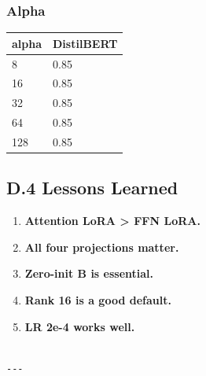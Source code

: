 \subsubsection{Alpha}

\begin{table}[H]
\centering
\small
\begin{tabular}{ll}
\toprule
\textbf{alpha} & \textbf{DistilBERT} \\
\midrule
8 & 0.85 \\
16 & 0.85 \\
32 & 0.85 \\
64 & 0.85 \\
128 & 0.85 \\
\bottomrule
\end{tabular}
\end{table}

\subsection{D.4 Lessons Learned}

\begin{enumerate}
\item \textbf{Attention LoRA \textgreater{} FFN LoRA.}
\item \textbf{All four projections matter.}
\item \textbf{Zero-init B is essential.}
\item \textbf{Rank 16 is a good default.}
\item \textbf{LR 2e-4 works well.}
\end{enumerate}
\begin{lstlisting}

---
\end{lstlisting}